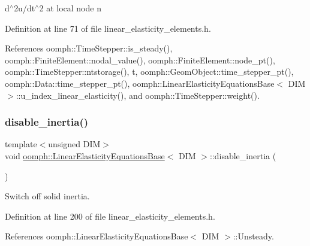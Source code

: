 d$^\wedge$2u/dt$^\wedge$2 at local node n 



Definition at line 71 of file linear\+\_\+elasticity\+\_\+elements.\+h.



References oomph\+::\+Time\+Stepper\+::is\+\_\+steady(), oomph\+::\+Finite\+Element\+::nodal\+\_\+value(), oomph\+::\+Finite\+Element\+::node\+\_\+pt(), oomph\+::\+Time\+Stepper\+::ntstorage(), t, oomph\+::\+Geom\+Object\+::time\+\_\+stepper\+\_\+pt(), oomph\+::\+Data\+::time\+\_\+stepper\+\_\+pt(), oomph\+::\+Linear\+Elasticity\+Equations\+Base$<$ D\+I\+M $>$\+::u\+\_\+index\+\_\+linear\+\_\+elasticity(), and oomph\+::\+Time\+Stepper\+::weight().

\mbox{\label{classoomph_1_1LinearElasticityEquationsBase_a148133abdf55b6e040724bc36f582757}} 
\subsubsection{\texorpdfstring{disable\+\_\+inertia()}{disable\_inertia()}}
{\footnotesize\ttfamily template$<$unsigned D\+IM$>$ \\
void \hyperlink{classoomph_1_1LinearElasticityEquationsBase}{oomph\+::\+Linear\+Elasticity\+Equations\+Base}$<$ D\+IM $>$\+::disable\+\_\+inertia (\begin{DoxyParamCaption}{ }\end{DoxyParamCaption})\hspace{0.3cm}{\ttfamily [inline]}}



Switch off solid inertia. 



Definition at line 200 of file linear\+\_\+elasticity\+\_\+elements.\+h.



References oomph\+::\+Linear\+Elasticity\+Equations\+Base$<$ D\+I\+M $>$\+::\+Unsteady.

\mbox{\label{classoomph_1_1LinearElasticityEquationsBase_ad9171d2f6ee9e0c947bdcfecbac7c1f7}} 
